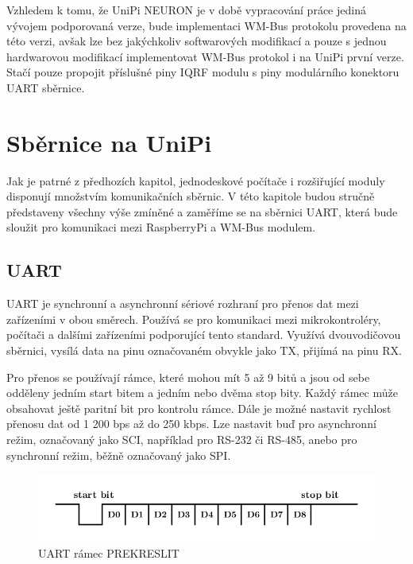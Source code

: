 Vzhledem k tomu, že UniPi NEURON je v době vypracování práce jediná vývojem podporovaná verze, bude implementaci WM-Bus protokolu provedena na této verzi, avšak lze bez jakýchkoliv softwarových modifikací a pouze s jednou hardwarovou modifikací implementovat WM-Bus protokol i na UniPi první verze. Stačí pouze propojit příslušné piny IQRF modulu s piny modulárního konektoru UART sběrnice.



\section{Sběrnice na UniPi}
Jak je patrné z předhozích kapitol, jednodeskové počítače i rozšiřující moduly disponují množstvím komunikačních sběrnic. V této kapitole budou stručně představeny všechny výše zmíněné a zaměříme se na sběrnici UART, která bude sloužit pro komunikaci mezi RaspberryPi a WM-Bus modulem.

\subsection{UART}
UART je synchronní a asynchronní sériové rozhraní pro přenos dat mezi zařízeními v obou směrech. Používá se pro komunikaci mezi mikrokontroléry, počítači a dalšími zařízeními podporující tento standard. Využívá dvouvodičovou sběrnici, vysílá data na pinu označovaném obvykle jako TX, přijímá na pinu RX.

Pro přenos se používají rámce, které mohou mít 5 až 9 bitů a jsou od sebe odděleny jedním start bitem a jedním nebo dvěma stop bity. Každý rámec může obsahovat ještě paritní bit pro kontrolu rámce. Dále je možné nastavit rychlost přenosu dat od 1 200 bps až do 250 kbps. Lze nastavit buď pro asynchronní režim, označovaný jako SCI, například pro RS-232 či RS-485, anebo pro synchronní režim, běžně označovaný jako SPI.

 \begin{figure}[!ht]
  \begin{center}
    \includegraphics[scale=1.0]{obrazky/sbernice_uart}
  \end{center}
  \caption{UART rámec \cite{SberniceUART} \colorbox[rgb]{1,0,0}{PREKRESLIT}}
\end{figure}

